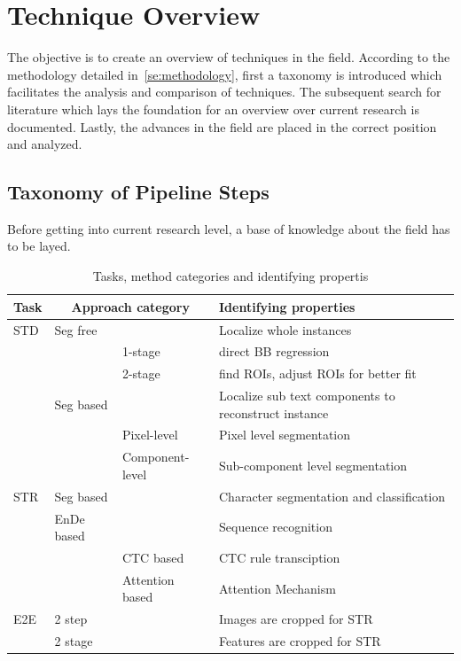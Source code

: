 \chapter{Technique Overview}\label{ch:research}
The objective is to create an overview of techniques in the field.
According to the methodology detailed in~\ref{se:methodology}, first a taxonomy is introduced
which facilitates the analysis and comparison of techniques.
The subsequent search for literature which lays the foundation for an overview over current research
is documented.
Lastly, the advances in the field are placed in the correct position and analyzed.

\section{Taxonomy of Pipeline Steps}\label{se:taxonomy}
Before getting into current research level, a base of knowledge about the field has to be layed.
\begin{table}[h]
    \centering\scriptsize
    \begin{tabular}{p{}p{}p{}p{}}
        Task & \multicolumn{2}{c}{Approach category} & Identifying properties \\
        \toprule
        STD & Seg free & & Localize whole instances  \\
            & & 1-stage & direct BB regression \\
            & & 2-stage & find ROIs, adjust ROIs for better fit \\
            & Seg based & & Localize sub text components to reconstruct instance \\
            & & Pixel-level & Pixel level segmentation \\
            & & Component-level & Sub-component level segmentation \\
        \midrule
        STR & Seg based & & Character segmentation and classification\\
            & \ac{EnDe} based & & Sequence recognition \\
            & & CTC based & CTC rule transciption \\
            & & Attention based & Attention Mechanism \\
        \midrule
        E2E & 2 step & & Images are cropped for STR \\
            & 2 stage & & Features are cropped for STR \\
        \bottomrule
    \end{tabular}
    \caption{Tasks, method categories and identifying propertis\label{tb:steps-properties}}
\end{table}

